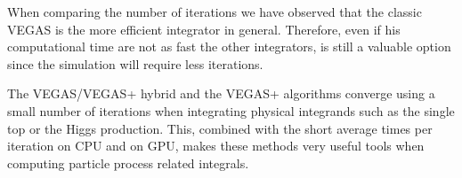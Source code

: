 \documentclass[../main/main.tex]{subfiles}
\begin{document}
When comparing the number of iterations we have observed that the classic VEGAS is the more efficient integrator in general. Therefore, even if his computational time are not as fast the other integrators, is still a valuable option since the simulation will require less iterations. 

The VEGAS/VEGAS+ hybrid and the VEGAS+ algorithms converge using a small number of iterations when integrating physical integrands such as the single top or the Higgs production. This, combined with the short average times per iteration on CPU and on GPU, makes these methods very useful tools when computing particle process related integrals.



	
\end{document}
